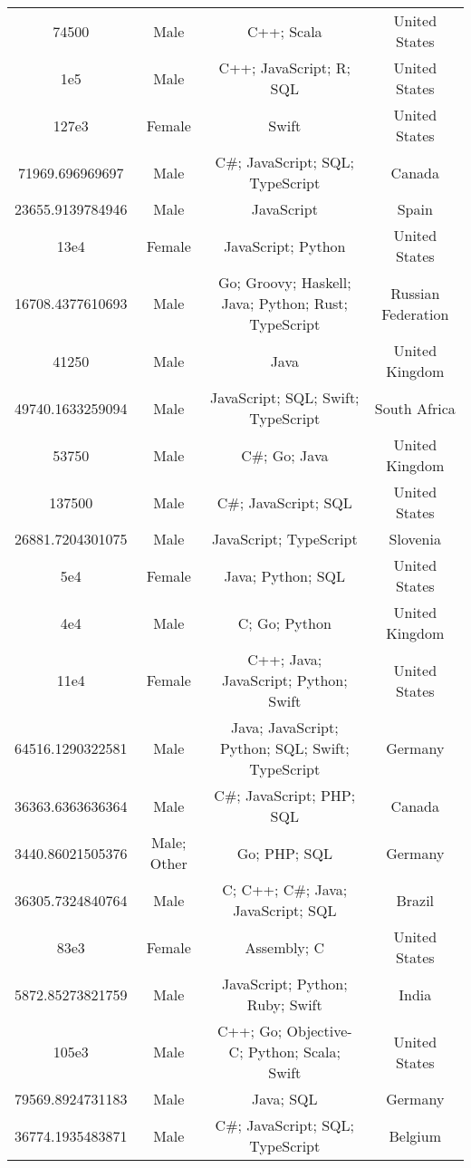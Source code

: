 \begin{center}
\begin{tabular}{ |c|c|c|c| }
74500  &  Male  &  C++; Scala  &  United States  \\ 
1e5  &  Male  &  C++; JavaScript; R; SQL  &  United States  \\ 
127e3  &  Female  &  Swift  &  United States  \\ 
71969.696969697  &  Male  &  C\#; JavaScript; SQL; TypeScript  &  Canada  \\ 
23655.9139784946  &  Male  &  JavaScript  &  Spain  \\ 
13e4  &  Female  &  JavaScript; Python  &  United States  \\ 
16708.4377610693  &  Male  &  Go; Groovy; Haskell; Java; Python; Rust; TypeScript  &  Russian Federation  \\ 
41250  &  Male  &  Java  &  United Kingdom  \\ 
49740.1633259094  &  Male  &  JavaScript; SQL; Swift; TypeScript  &  South Africa  \\ 
53750  &  Male  &  C\#; Go; Java  &  United Kingdom  \\ 
137500  &  Male  &  C\#; JavaScript; SQL  &  United States  \\ 
26881.7204301075  &  Male  &  JavaScript; TypeScript  &  Slovenia  \\ 
5e4  &  Female  &  Java; Python; SQL  &  United States  \\ 
4e4  &  Male  &  C; Go; Python  &  United Kingdom  \\ 
11e4  &  Female  &  C++; Java; JavaScript; Python; Swift  &  United States  \\ 
64516.1290322581  &  Male  &  Java; JavaScript; Python; SQL; Swift; TypeScript  &  Germany  \\ 
36363.6363636364  &  Male  &  C\#; JavaScript; PHP; SQL  &  Canada  \\ 
3440.86021505376  &  Male; Other  &  Go; PHP; SQL  &  Germany  \\ 
36305.7324840764  &  Male  &  C; C++; C\#; Java; JavaScript; SQL  &  Brazil  \\ 
83e3  &  Female  &  Assembly; C  &  United States  \\ 
5872.85273821759  &  Male  &  JavaScript; Python; Ruby; Swift  &  India  \\ 
105e3  &  Male  &  C++; Go; Objective-C; Python; Scala; Swift  &  United States  \\ 
79569.8924731183  &  Male  &  Java; SQL  &  Germany  \\ 
36774.1935483871  &  Male  &  C\#; JavaScript; SQL; TypeScript  &  Belgium  \\ 

\end{tabular}
\end{center}
